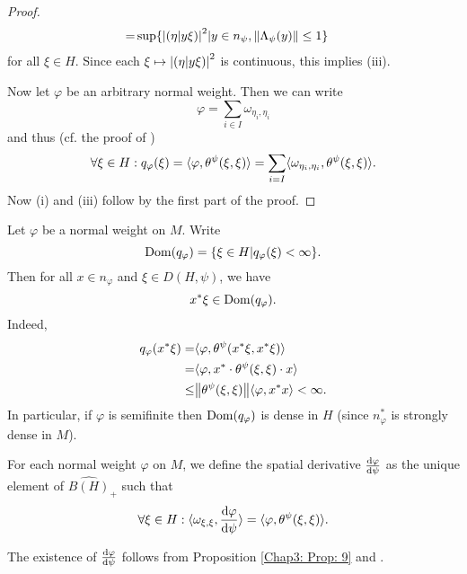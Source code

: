 \begin{proof}
\[\begin{split}
            =&\sup\{\abs{(\eta|y\xi)}^2|y\in n_\psi,\norm{\Lambda_\psi(y)}\leq 1\}
        \end{split}
    \]
    for all $\xi\in H$. Since each $\xi\mapsto \abs{(\eta|y\xi)}^2$ is continuous, this implies (iii).\par
    Now let $\varphi$ be an arbitrary normal weight. Then we can write
    \[
        \varphi=\sum_{i\in I}\omega_{\eta_i,\eta_i}
    \]
    and thus (cf. the proof of \cite[Proposition 1.10]{7})
    \[
        \forall \xi\in H:  q_\varphi(\xi)=\langle\varphi,\theta^\psi(\xi,\xi)\rangle=\sum_{i=I}\langle\omega_{\eta_i,\eta_i},\theta^\psi(\xi,\xi)\rangle.
    \]
    Now (i) and (iii) follow by the first part of the proof.
\end{proof}
\begin{remark}
    Let $\varphi$ be a normal weight on $M$. Write
    \begin{equation}
        \operatorname{Dom}(q_\varphi)=\{\xi\in H|q_\varphi(\xi)<\infty\}.
    \end{equation}
    Then for all $x\in n_\varphi$ and $\xi\in D(H,\psi)$, we have
    \begin{equation}
        x^*\xi\in \operatorname{Dom}(q_\varphi).
    \end{equation}
    Indeed,
    \[
        \begin{split}
            q_\varphi(x^*\xi)=&\langle\varphi,\theta^\psi(x^*\xi,x^*\xi)\rangle\\
            =&\langle\varphi,x^*\cdot\theta^\psi(\xi,\xi)\cdot x\rangle\\
            \leq &\norm{\theta^\psi(\xi,\xi)}\langle\varphi,x^*x\rangle<\infty.
        \end{split}
    \]
    In particular, if $\varphi$ is semifinite then $\operatorname{Dom}(q_\varphi)$ is dense in $H$ (since $n_\varphi^*$ is strongly dense in $M$).
\end{remark}
\begin{definition}\label{Chap3: Def: 11}
    For each normal weight $\varphi$ on $M$, we define the spatial derivative $\dv{\varphi}{\psi}$ as the unique element of $\widehat{B(H)}_+$ such that
    \begin{equation}\label{Chap3: Eqn: 9}
        \forall \xi\in H: \langle\omega_{\xi,\xi},\dv{\varphi}{\psi}\rangle=\langle\varphi,\theta^\psi(\xi,\xi)\rangle.
    \end{equation}
\end{definition}
The existence of $\dv{\varphi}{\psi}$ follows from Proposition \ref{Chap3: Prop: 9} and \cite[proof of Lemma 1.4]{7}.
